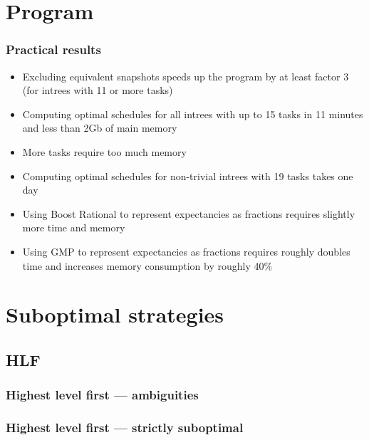 \documentclass{beamer}
\begin{document}
\section{Program}

\begin{frame}
  \frametitle{Practical results}
  \begin{itemize}
  \item Excluding equivalent snapshots speeds up the program by at least factor 3 (for intrees with 11 or more tasks)
  \item Computing optimal schedules for all intrees with up to 15 tasks in 11 minutes and less than 2Gb of main memory
  \item More tasks require too much memory
  \item Computing optimal schedules for non-trivial intrees with 19 tasks takes one day
  \item Using Boost Rational to represent expectancies as fractions requires slightly more time and memory
  \item Using GMP to represent expectancies as fractions requires roughly doubles time and increases memory consumption by roughly 40\%
  \end{itemize}
\end{frame}

\section{Suboptimal strategies}

\subsection{HLF}

\begin{frame}
  \frametitle{Highest level first --- ambiguities}
  
\end{frame}

\begin{frame}
  \frametitle{Highest level first --- strictly suboptimal}
  \begin{columns}[ht]
    \begin{column}{.45\textwidth}
      \centering
      
    \end{column}
    \begin{column}{.45\textwidth}
      \centering
      
    \end{column}
  \end{columns}
\end{frame}
\end{document}
